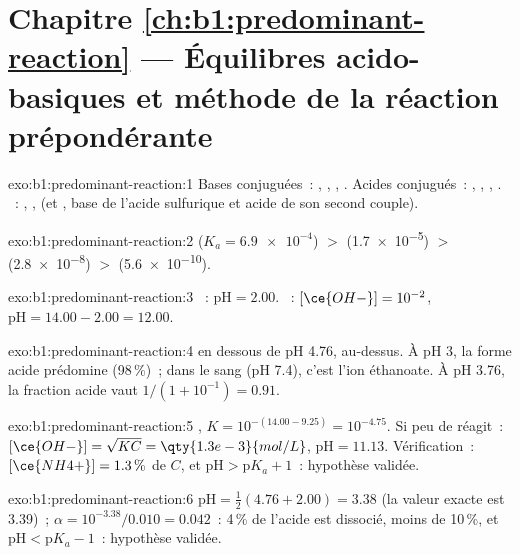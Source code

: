 \section*{Chapitre \ref{ch:b1:predominant-reaction} --- Équilibres acido-basiques et méthode de la réaction prépondérante}

\begin{solution}{exo:b1:predominant-reaction:1}
Bases conjuguées~: , , , . Acides
conjugués~: , , , . ~:
, ,  (et , base de l'acide
sulfurique et acide de son second couple).
\end{solution}

\begin{solution}{exo:b1:predominant-reaction:2}
 ($K_a = \num{6.9e-4}$) $>$  (\num{1.7e-5}) $>$ 
(\num{2.8e-8}) $>$  (\num{5.6e-10}).
\end{solution}

\begin{solution}{exo:b1:predominant-reaction:3}
~: $\mathrm{pH} = 2.00$. ~: $[\ce{OH-}] = 10^{-2}$,
$\mathrm{pH} = 14.00 - 2.00 = 12.00$.
\end{solution}

\begin{solution}{exo:b1:predominant-reaction:4}
 en dessous de pH 4.76,  au-dessus. À pH 3, la
forme acide prédomine (98\,\%)~; dans le sang (pH 7.4), c'est l'ion
éthanoate. À pH 3.76, la fraction acide vaut $1/(1 + 10^{-1}) = 0.91$.
\end{solution}

\begin{solution}{exo:b1:predominant-reaction:5}
 , $K = 10^{-(14.00 -
9.25)} = 10^{-4.75}$. Si peu de  réagit~: $[\ce{OH-}] = \sqrt{K C} =
\qty{1.3e-3}{mol/L}$, $\mathrm{pH} = 11.13$. Vérification~: $[\ce{NH4+}] = 1.3\,\%$
de $C$, et
$\mathrm{pH} > \mathrm{p}K_a + 1$~: hypothèse validée.
\end{solution}

\begin{solution}{exo:b1:predominant-reaction:6}
$\mathrm{pH} = \frac12(4.76 + 2.00) = 3.38$ (la valeur exacte est
3.39)~; $\alpha = 10^{-3.38}/0.010 = 0.042$~: 4\,\% de l'acide est
dissocié, moins de 10\,\%, et $\mathrm{pH} < \mathrm{p}K_a - 1$~:
hypothèse validée.
\end{solution}

